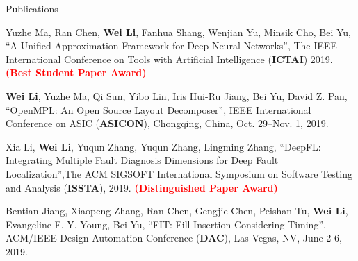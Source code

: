 \begin{rSection}{Publications}
\begin{description}[font=\normalfont]
{}
\item[{[C4]}]{
    Yuzhe Ma, Ran Chen, \textbf{Wei Li}, Fanhua Shang, Wenjian Yu, Minsik Cho, Bei Yu, 
    ``A Unified Approximation Framework for Deep Neural Networks'', The IEEE International Conference on Tools with Artificial Intelligence (\textbf{ICTAI}) 2019. \textcolor{red}{\textbf{(Best Student Paper Award)}}
}
\item[{[C3]}]{
    \textbf{Wei Li}, Yuzhe Ma, Qi Sun, Yibo Lin, Iris Hui-Ru Jiang, Bei Yu, David Z. Pan,
    ``OpenMPL: An Open Source Layout Decomposer'', IEEE International Conference on ASIC (\textbf{ASICON}), Chongqing, China, Oct. 29–Nov. 1, 2019. 
}
\item[{[C2]}]{
    Xia Li, \textbf{Wei Li}, Yuqun Zhang, Yuqun Zhang, Lingming Zhang, 
    ``DeepFL: Integrating Multiple Fault Diagnosis Dimensions for Deep Fault Localization'',The ACM SIGSOFT International Symposium on Software Testing and Analysis 
      (\textbf{ISSTA}), 2019. \textcolor{red}{\textbf{(Distinguished Paper Award)}}
}
\item[{[C1]}]{
    Bentian Jiang, Xiaopeng Zhang, Ran Chen, Gengjie Chen, Peishan Tu, \textbf{Wei Li}, Evangeline F. Y. Young, Bei Yu, 
    ``FIT: Fill Insertion Considering Timing'', 
    ACM/IEEE Design Automation Conference (\textbf{DAC}), Las Vegas, NV, June 2-6, 2019.
}


\end{description}


\end{rSection}

